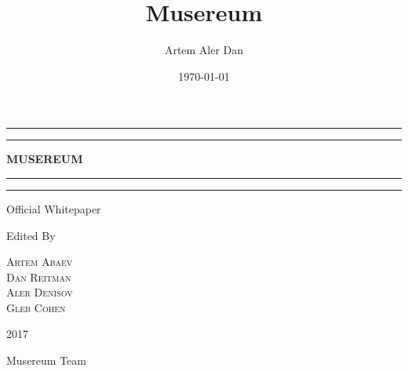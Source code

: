 \documentclass[12pt]{report}
\title{Musereum}
\author{Artem Aler Dan}
\date{\today}
\begin{document}
\begin{titlepage}
	\centering
	
	\scshape %
	\vspace*{\baselineskip} %
	
	\rule{\textwidth}{1.6pt}\vspace*{-\baselineskip}\vspace*{2pt} %
	\rule{\textwidth}{0.4pt} %
	
	\vspace{0.75\baselineskip} %
	
	{\LARGE\textbf{MUSEREUM}} %
	
	\vspace{0.75\baselineskip} %
	
	\rule{\textwidth}{0.4pt}\vspace*{-\baselineskip}\vspace{3.2pt} %
	\rule{\textwidth}{1.6pt} %
	
	\vspace{2\baselineskip} %
	
	
	Official Whitepaper %
	
	\vspace*{3\baselineskip} %
	
	
	
	Edited By
	
	\vspace{0.5\baselineskip} %
	
	{\scshape\Large Artem Abaev \\ Dan Reitman \\ Aler Denisov \\ Gleb Cohen \\} %
	
	
	
	\vfill %
	
		
	\vspace{0.3\baselineskip} %
	
	2017 %
	
	{\large Musereum Team} %

\end{titlepage}
\end{document}
